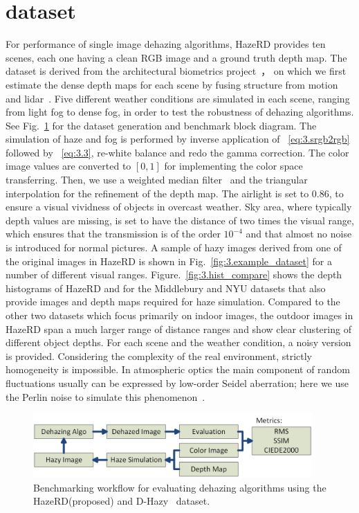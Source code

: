 \section{dataset}
\label{sec:3.4.dataset}
For performance of single image dehazing algorithms, HazeRD provides ten scenes, each one having a clean RGB image and a ground truth depth map. The dataset is derived from the architectural biometrics project~\cite{Ding:ArchBio:ICIP16,ArchBioProjWebsite}， on which we first estimate the dense depth maps for each scene by fusing structure from motion and lidar~\cite{Ding:FuseLidarSFM:ICASSP17}. Five different weather conditions are simulated in each scene, ranging from light fog to dense fog, in order to test the robustness of dehazing algorithms. See Fig.~\ref{fig:3.block_diagram} for the dataset generation and benchmark block diagram. The simulation of haze and fog is performed by inverse application of ~\eqref{eq:3.srgb2rgb} followed by ~\eqref{eq:3.3}, re-white balance and redo the gamma correction. The color image values are converted to $[0,1]$ for implementing the color space transferring. Then, we use a weighted median filter~\cite{ma2013constant} and the triangular interpolation for the refinement of the depth map. The airlight is set to 0.86, to ensure a visual vividness of objects in overcast weather. Sky area, where typically depth values are missing, is set to have the distance of two times the visual range, which ensures that the transmission is of the order $10^{-4}$ and that almost no noise is introduced for normal pictures. A sample of hazy images derived from one of the original images in HazeRD is shown in Fig.~\ref{fig:3.example_dataset} for a number of different visual ranges. Figure.~\ref{fig:3.hist_compare} shows the depth histograms of HazeRD and for the Middlebury and NYU datasets that also provide images and depth maps required for haze simulation. Compared to the other two datasets which focus primarily on indoor images, the outdoor images in HazeRD span a much larger range of distance ranges and show clear clustering of different object depths. For each scene and the weather condition, a noisy version is provided. Considering the complexity of the real environment, strictly homogeneity is impossible. In atmospheric optics the main component of random fluctuations usually can be expressed by low-order Seidel aberration; here we use the Perlin noise to simulate this phenomenon~\cite{tarel2012vision}. 
\begin{figure}[htb]
\centering
\centerline{\includegraphics[width = 0.95\textwidth]{hazerd/block_diagram}}
\caption{Benchmarking workflow for evaluating dehazing algorithms using the HazeRD(proposed) and D-Hazy~\cite{7532754} dataset.}
\label{fig:3.block_diagram}
\end{figure}
